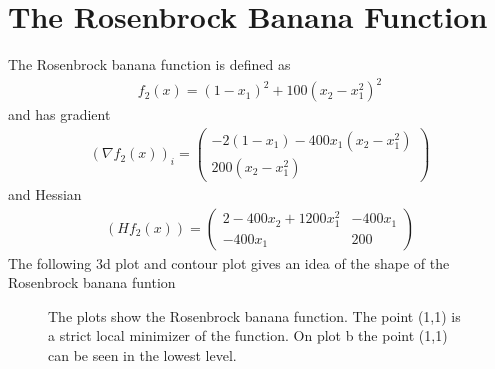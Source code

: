\documentclass[a4paper]{article}
\begin{document}
\section{The Rosenbrock Banana Function}
The Rosenbrock banana function is defined as
\begin{align*}
  f_2(x) = (1-x_1)^2 + 100(x_2-x_1^2)^2
\end{align*}
and has gradient
\begin{align*}
  (\nabla f_2(x))_i =
  \begin{pmatrix}
    -2(1-x_1)-400x_1(x_2-x_1^2)\\
    200(x_2-x_1^2)
   \end{pmatrix}
\end{align*}
and Hessian
\begin{align*}
  (Hf_2(x)) =
  \left(
  \begin{array}{cc}
    2-400x_2+1200x_1^2 & -400x_1\\
    -400x_1           &  200
  \end{array}
  \right)
\end{align*}
The following 3d plot and contour plot gives an idea of the shape of the Rosenbrock banana funtion 
\begin{figure}[h]
    \centering
    \qquad
    \caption{The plots show the Rosenbrock banana function. The point (1,1) is a strict local minimizer  of the function. On plot b the point (1,1) can be seen in the lowest level.}%
    \label{fig:2}%
\end{figure}
\end{document}
